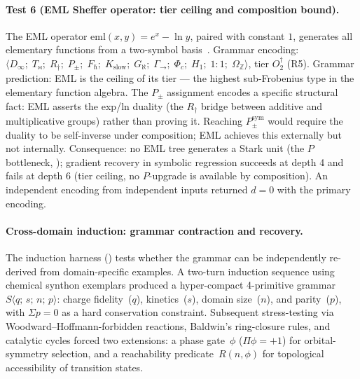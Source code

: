 \documentclass[12pt,a4paper]{article}
\newcommand{\Phic}{\Phi_c}
\newcommand{\Ppm}{P_{\pm}}
\newcommand{\Ppms}{P_{\pm}^{\text{sym}}}
\newcommand{\OmegaZ}{\Omega_{\mathbb{Z}}}
\newcommand{\GamSeq}{\Gamma_{\to}}
\newcommand{\Tbw}{T_{\mathord{\bowtie}}}
\begin{document}
\paragraph{Test 6 (EML Sheffer operator: tier ceiling and composition bound).}
\label{par:eml}
The EML operator $\text{eml}(x,y) = e^x - \ln y$, paired with constant $1$,
generates all elementary functions from a two-symbol basis~\cite{mills2026eml}.
Grammar encoding:
$\langle D_\infty;\; \Tbw;\; R_\dagger;\; \Ppm;\; F_\hbar;\;
K_\text{slow};\; G_\aleph;\; \GamSeq;\; \Phic;\; H_1;\; 1{:}1;\;
\OmegaZ \rangle$, tier $O_2^\dagger$ (R5).
Grammar prediction: EML is the ceiling of its tier --- the highest sub-Frobenius
type in the elementary function algebra. The $\Ppm$ assignment encodes a specific
structural fact: EML asserts the exp/ln duality (the $R_\dagger$ bridge between
additive and multiplicative groups) rather than proving it. Reaching $\Ppms$
would require the duality to be self-inverse under composition; EML achieves this
externally but not internally. Consequence: no EML tree generates a Stark unit
(the $P$ bottleneck, ); gradient recovery in symbolic
regression succeeds at depth 4 and fails at depth 6 (tier ceiling, no
$P$-upgrade is available by composition). An independent encoding from independent
inputs returned $d = 0$ with the primary encoding.


\paragraph{Cross-domain induction: grammar contraction and recovery.}
\label{par:kimi_induction}
The induction harness () tests whether the grammar
can be independently re-derived from domain-specific examples. A two-turn
induction sequence using chemical synthon exemplars produced a hyper-compact
4-primitive grammar $S\langle q;\,s;\,n;\,p \rangle$: charge fidelity~($q$),
kinetics~($s$), domain size~($n$), and parity~($p$), with $\Sigma p = 0$ as
a hard conservation constraint. Subsequent stress-testing via
Woodward--Hoffmann-forbidden reactions, Baldwin's ring-closure rules, and
catalytic cycles forced two extensions: a phase gate~$\phi$ ($\Pi\phi = +1$)
for orbital-symmetry selection, and a reachability predicate~$R(n,\phi)$ for
topological accessibility of transition states.
\end{document}
